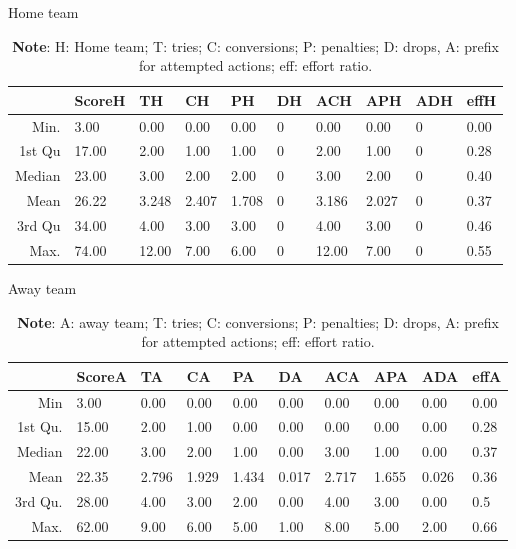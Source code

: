 \documentclass[]{article}
\begin{document}
\begin{table}[h!]
	\centering
	\caption{Home team}
	\label{tab:home}
	\begin{tabular}{rlllllllll}
		\hline
		&     ScoreH &       TH &       CH &       PH &       DH 	&      ACH &      APH &      ADH &effH\\ 
		\hline
		Min. & 3.00   & 0.00   & 0.00   & 0.00   & 0  & 0.00   & 0.00   & 0   & 0.00\\ 
		1st Qu & 17.00   & 2.00   & 1.00   &1.00   & 0  & 2.00   & 1.00   & 0   &0.28 \\ 
		Median & 23.00   & 3.00   & 2.00   & 2.00   & 0   & 3.00   & 2.00   & 0   &0.40 \\ 
		Mean & 26.22   & 3.248   & 2.407   & 1.708   & 0   & 3.186   & 2.027   & 0   &0.37 \\ 
		3rd Qu & 34.00   & 4.00   & 3.00   & 3.00   & 0   &  4.00   & 3.00   & 0   &0.46  \\ 
		Max. & 74.00   & 12.00   & 7.00   & 6.00   & 0   & 12.00   & 7.00   &0   & 0.55 \\ 
		\hline
	\end{tabular}
	\caption*{\textbf{Note}: H: Home team; T: tries; C: conversions; P: penalties; D: drops, A: prefix for attempted actions; eff: effort ratio.}
\end{table}

\begin{table}[h!]
	\centering
	\caption{Away team}
	\label{tab:away}
	\begin{tabular}{rlllllllll}
		\hline
		&     ScoreA &       TA &       CA &       PA &       DA&      ACA &      APA &      ADA& effA\\ 
		\hline
		Min &  3.00   & 0.00   & 0.00   & 0.00   & 0.00  &0.00   & 0.00   & 0.00&0.00 \\ 
		1st Qu. & 15.00   & 2.00   & 1.00   & 0.00   & 0.00  &0.00   & 0.00   & 0.00 &0.28 \\ 
		Median  & 22.00   & 3.00   & 2.00   & 1.00   & 0.00&3.00   & 1.00   & 0.00&0.37   \\ 
		Mean & 22.35   & 2.796   & 1.929   & 1.434   & 0.017 &2.717   & 1.655   & 0.026&0.36  \\ 
		3rd Qu. & 28.00   & 4.00   & 3.00   & 2.00   & 0.00 &4.00   & 3.00   & 0.00&0.5  \\ 
		Max. & 62.00   & 9.00   & 6.00   & 5.00   & 1.00 &8.00   & 5.00   & 2.00  &0.66\\ 
		\hline
	\end{tabular}
	\caption*{\textbf{Note}: A: away team; T: tries; C: conversions; P: penalties; D: drops, A: prefix for attempted actions; eff: effort ratio.}
\end{table}
\end{document}
